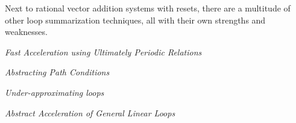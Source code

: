 
Next to rational vector addition systems with resets, there are a multitude of other loop summarization techniques, all with their own strengths and weaknesses.

\textsl{Fast Acceleration using Ultimately Periodic Relations}\cite{10.1007/978-3-642-14295-6_23} 

\textsl{Abstracting Path Conditions}\cite{DBLP:conf/issta/StrejcekT12}

\textsl{Under-approximating loops}\cite{DBLP:conf/cav/KroeningLW13}

\textsl{Abstract Acceleration of General Linear Loops}\cite{DBLP:conf/popl/JeannetSS14}